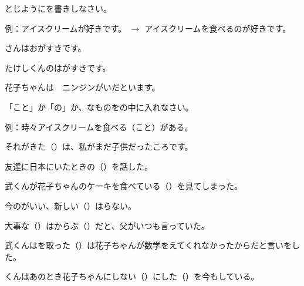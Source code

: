 
\author{Tomislav Mamić}

	
	\ten\begin{mondai}{とじようにを書きしなさい。}
		\itemsep0pt
		\item 例：アイスクリームが好きです。 $\rightarrow$ アイスクリームを食べるのが好きです。
		\item {}さんはおがすきです。
		\item たけしくんのは\hspace{10pt}がすきです。
		\item 花子ちゃんは　ニンジンがいだといます。
	\end{mondai}

	\vspace{20pt}
	\ten\begin{mondai}{「こと」か「の」か、なものをの中に入れなさい。}
		\itemsep0pt
		\item 例：時々アイスクリームを食べる（こと）がある。
		\item それがきた（\hspace{20pt}）は、私がまだ子供だったころです。
		\item 友達に日本にいたときの（\hspace{20pt}）を話した。
		\item 武くんが花子ちゃんのケーキを食べている（\hspace{20pt}）を見てしまった。
		\item 今のがいい、新しい（\hspace{20pt}）はらない。
		\item *大事な（\hspace{20pt}）はからぶ（\hspace{20pt}）だと、父がいつも言っていた。
		\item *武くんはを取った（\hspace{20pt}）は花子ちゃんが数学をえてくれなかったからだと言いをした。
		\item*{}くんはあのとき花子ちゃんにしない（\hspace{20pt}）にした（\hspace{20pt}）を今もしている。
	\end{mondai}
